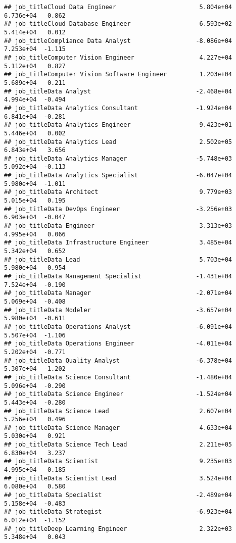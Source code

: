 \documentclass[
]{article}
\begin{document}
\begin{verbatim}
## job_titleCloud Data Engineer                       5.804e+04  6.736e+04   0.862
## job_titleCloud Database Engineer                   6.593e+02  5.414e+04   0.012
## job_titleCompliance Data Analyst                  -8.086e+04  7.253e+04  -1.115
## job_titleComputer Vision Engineer                  4.227e+04  5.112e+04   0.827
## job_titleComputer Vision Software Engineer         1.203e+04  5.689e+04   0.211
## job_titleData Analyst                             -2.468e+04  4.994e+04  -0.494
## job_titleData Analytics Consultant                -1.924e+04  6.841e+04  -0.281
## job_titleData Analytics Engineer                   9.423e+01  5.446e+04   0.002
## job_titleData Analytics Lead                       2.502e+05  6.843e+04   3.656
## job_titleData Analytics Manager                   -5.748e+03  5.092e+04  -0.113
## job_titleData Analytics Specialist                -6.047e+04  5.980e+04  -1.011
## job_titleData Architect                            9.779e+03  5.015e+04   0.195
## job_titleData DevOps Engineer                     -3.256e+03  6.903e+04  -0.047
## job_titleData Engineer                             3.313e+03  4.995e+04   0.066
## job_titleData Infrastructure Engineer              3.485e+04  5.342e+04   0.652
## job_titleData Lead                                 5.703e+04  5.980e+04   0.954
## job_titleData Management Specialist               -1.431e+04  7.524e+04  -0.190
## job_titleData Manager                             -2.071e+04  5.069e+04  -0.408
## job_titleData Modeler                             -3.657e+04  5.980e+04  -0.611
## job_titleData Operations Analyst                  -6.091e+04  5.507e+04  -1.106
## job_titleData Operations Engineer                 -4.011e+04  5.202e+04  -0.771
## job_titleData Quality Analyst                     -6.378e+04  5.307e+04  -1.202
## job_titleData Science Consultant                  -1.480e+04  5.096e+04  -0.290
## job_titleData Science Engineer                    -1.524e+04  5.443e+04  -0.280
## job_titleData Science Lead                         2.607e+04  5.256e+04   0.496
## job_titleData Science Manager                      4.633e+04  5.030e+04   0.921
## job_titleData Science Tech Lead                    2.211e+05  6.830e+04   3.237
## job_titleData Scientist                            9.235e+03  4.995e+04   0.185
## job_titleData Scientist Lead                       3.524e+04  6.080e+04   0.580
## job_titleData Specialist                          -2.489e+04  5.158e+04  -0.483
## job_titleData Strategist                          -6.923e+04  6.012e+04  -1.152
## job_titleDeep Learning Engineer                    2.322e+03  5.348e+04   0.043

\end{verbatim}
\end{document}
